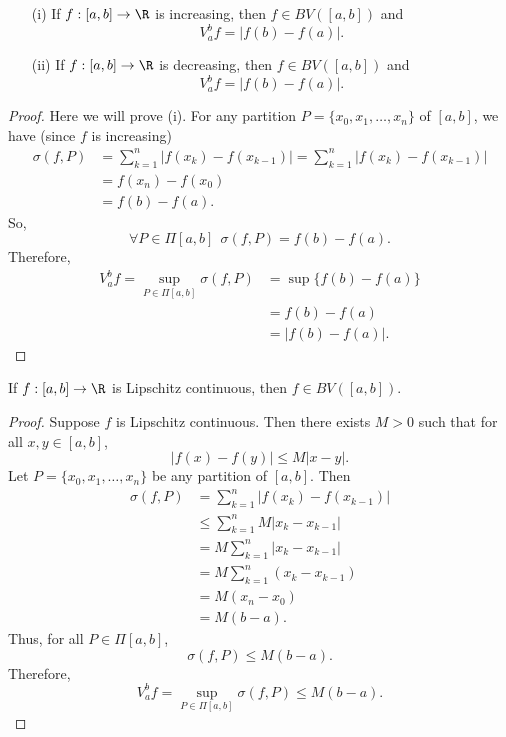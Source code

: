 \begin{theorem}[Theorem 1]
    \begin{enumerate}
        \item[(i)] If \( f: [a,b] \to \R  \) is increasing, then \( f \in BV ([a,b]) \) and  
            \[  {V}_{a}^{b} f = | f(b) - f(a) |. \]
        \item[(ii)] If \( f: [a,b] \to \R  \) is decreasing, then \( f \in BV([a,b]) \) and 
            \[  {V}_{a}^{b} f = | f(b) - f(a) |. \]
    \end{enumerate}
\end{theorem}
\begin{proof}
    Here we will prove (i). For any partition \( P = \{  {x}_{0}, {x}_{1}, \dots, {x}_{n} \}  \) of \( [a,b] \), we have (since \( f  \) is increasing) 
    \begin{align*}
        \sigma(f,P) &= \sum_{ k=1  }^{ n } | f({x}_{k}) - f({x}_{k-1}) | = \sum_{ k=1  }^{ n } | f({x}_{k}) - f({x}_{k-1}) |   \\
                    &= f({x}_{n}) - f({x}_{0}) \\
                    &= f(b) - f(a).
    \end{align*}
    So, 
    \[  \forall P \in \Pi[a,b] \ \ \sigma(f,P) = f(b) - f(a). \]
    Therefore, 
    \begin{align*}
        {V}_{a}^{b} f = \sup_{P \in \Pi[a,b]} \sigma(f,P) &= \sup \{ f(b) - f(a) \}  \\
                                                          &= f(b) - f(a) \\
                                                          &= | f(b) - f(a) |.
    \end{align*}
\end{proof}

\begin{theorem}
    If \( f: [a,b] \to \R  \) is Lipschitz continuous, then \( f \in BV([a,b]) \). 
\end{theorem}
\begin{proof}
    Suppose \( f  \) is Lipschitz continuous. Then there exists \( M > 0  \) such that for all \( x,y \in [a,b] \), 
    \[  | f(x) - f(y) |  \leq M |  x -y  |. \]
    Let \( P = \{ {x}_{0}, {x}_{1}, \dots, {x}_{n} \}  \) be any partition of \( [a,b] \). Then
    \begin{align*}
        \sigma(f,P) &= \sum_{ k=1  }^{ n } | f({x}_{k}) - f({x}_{k-1}) |  \\
                    &\leq \sum_{ k=1  }^{ n } M | {x}_{k } - {x}_{k-1} | \\
                    &= M \sum_{ k=1  }^{ n } | {x}_{k} - {x}_{k-1} |  \\
                    &= M \sum_{ k=1  }^{ n } ({x}_{k} - {x}_{k-1}) \\
                    &= M ({x}_{n} - {x}_{0}) \\
                    &= M(b-a).
    \end{align*}
    Thus, for all \(  P \in \Pi[a,b] \), 
    \[  \sigma(f,P) \leq M(b-a). \]
    Therefore, 
    \[  {V}_{a}^{b} f = \sup_{P \in \Pi[a,b]} \sigma(f,P) \leq M (b-a). \]
\end{proof}

